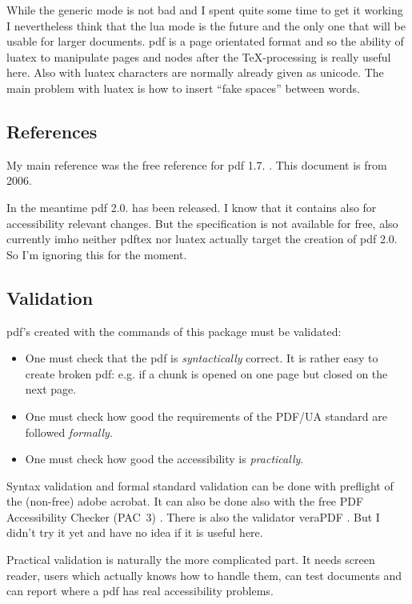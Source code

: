 \documentclass[DIV=12,parskip=half-,bibliography=totoc]{scrartcl}
\begin{document}
While the generic mode is not bad and I spent quite some time to get it working I nevertheless think that the lua mode is the future and the only one that will be usable for larger documents. pdf is a page orientated format and so the ability of luatex to manipulate pages and nodes after the \TeX-processing is really useful here. Also with luatex characters are normally already given as unicode. The main problem with luatex is how to insert \enquote{fake spaces} between words.



\subsection{References}

My main reference was the free reference for pdf 1.7. \parencite{pdfreference}. This document is from 2006.

In the meantime pdf 2.0. has been released. I know that it contains also for accessibility relevant changes. But the specification is not available for free, also currently imho neither pdftex nor luatex actually target the creation of pdf 2.0. So I'm ignoring this for the moment.


\subsection{Validation}

pdf's created with the commands of this package must be validated:

\begin{itemize}
\item One must check that the pdf is \emph{syntactically} correct. It is rather easy to create broken pdf: e.g. if a chunk is opened on one page but closed on the next page.
\item One must check how good the requirements of the PDF/UA standard are followed \emph{formally}.
\item One must check how good the accessibility is \emph{practically}.
\end{itemize}

Syntax validation and formal standard validation can be done with preflight of the (non-free) adobe acrobat.
It can also be done also with the free PDF Accessibility Checker (PAC~3) \parencite{pac3}.
There is also the validator veraPDF \parencite{verapdf}. But I didn't try it yet and have no idea if it is useful here.

Practical validation is naturally the more complicated part. It needs screen reader, users which actually knows how to handle them, can test documents and can report where a pdf has real accessibility problems.
\end{document}

